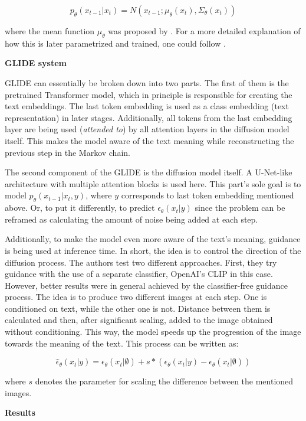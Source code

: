 \documentclass[
]{krantz}
\begin{document}
\[p_{\theta}(x_{t-1}|x_{t})=N(x_{t-1};\mu_{\theta}(x_{t}),\Sigma_{\theta}(x_{t}))\]

where the mean function \(\mu_{\theta}\) was proposed by \citet{DenoisingDiffusion2020}. For a more detailed explanation of how this is later parametrized and trained, one could follow \citet{weng2021diffusion}.

\textbf{GLIDE system}

GLIDE can essentially be broken down into two parts. The first of them is the pretrained Transformer model, which in principle is responsible for creating the text embeddings. The last token embedding is used as a class embedding (text representation) in later stages. Additionally, all tokens from the last embedding layer are being used (\emph{attended to}) by all attention layers in the diffusion model itself. This makes the model aware of the text meaning while reconstructing the previous step in the Markov chain.

The second component of the GLIDE is the diffusion model itself. A U-Net-like architecture with multiple attention blocks is used here. This part's sole goal is to model \(p_{\theta}(x_{t-1}|x_{t},y)\), where \(y\) corresponds to last token embedding mentioned above. Or, to put it differently, to predict \(\epsilon_{\theta}(x_{t}|y)\) since the problem can be reframed as calculating the amount of noise being added at each step.

Additionally, to make the model even more aware of the text's meaning, guidance is being used at inference time. In short, the idea is to control the direction of the diffusion process. The authors test two different approaches. First, they try guidance with the use of a separate classifier, OpenAI's CLIP in this case. However, better results were in general achieved by the classifier-free guidance process. The idea is to produce two different images at each step. One is conditioned on text, while the other one is not. Distance between them is calculated and then, after significant scaling, added to the image obtained without conditioning. This way, the model speeds up the progression of the image towards the meaning of the text. This process can be written as:

\[\hat{\epsilon}_\theta(x_{t}|y)=\epsilon_{\theta}(x_{t}|\emptyset)+s*(\epsilon_{\theta}(x_{t}|y)-\epsilon_{\theta}(x_{t}|\emptyset))\]

where \(s\) denotes the parameter for scaling the difference between the mentioned images.

\textbf{Results}
\end{document}
